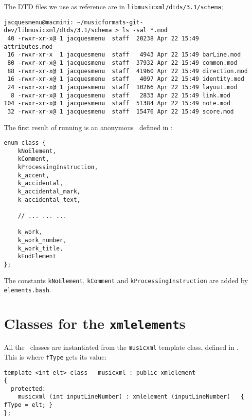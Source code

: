 The DTD files we use as reference are in {\tt libmusicxml/dtds/3.1/schema};
\begin{lstlisting}[language=Terminal]
jacquesmenu@macmini: ~/musicformats-git-dev/libmusicxml/dtds/3.1/schema > ls -sal *.mod
 40 -rwxr-xr-x@ 1 jacquesmenu  staff  20238 Apr 22 15:49 attributes.mod
 16 -rwxr-xr-x  1 jacquesmenu  staff   4943 Apr 22 15:49 barLine.mod
 80 -rwxr-xr-x@ 1 jacquesmenu  staff  37932 Apr 22 15:49 common.mod
 88 -rwxr-xr-x@ 1 jacquesmenu  staff  41960 Apr 22 15:49 direction.mod
 16 -rwxr-xr-x@ 1 jacquesmenu  staff   4097 Apr 22 15:49 identity.mod
 24 -rwxr-xr-x@ 1 jacquesmenu  staff  10266 Apr 22 15:49 layout.mod
  8 -rwxr-xr-x@ 1 jacquesmenu  staff   2833 Apr 22 15:49 link.mod
104 -rwxr-xr-x@ 1 jacquesmenu  staff  51384 Apr 22 15:49 note.mod
 32 -rwxr-xr-x@ 1 jacquesmenu  staff  15476 Apr 22 15:49 score.mod
\end{lstlisting}

The first result of running  is an anonymous \enumType\ defined in :
\begin{lstlisting}[language=CPlusPlus]
enum class {
	kNoElement,
	kComment,
	kProcessingInstruction,
	k_accent,
	k_accidental,
	k_accidental_mark,
	k_accidental_text,

	// ... ... ...

	k_work,
	k_work_number,
	k_work_title,
	kEndElement
};
\end{lstlisting}

The constants {\tt kNoElement}, {\tt kComment} and {\tt kProcessingInstruction} are added by {\tt elements.bash}.


\section{Classes for the {\tt xmlelement}s}

All the \mxml\ classes are instantiated from the {\tt musicxml} template class, defined in . This is where {\tt fType} gets its value:
\begin{lstlisting}[language=CPlusPlus]
template <int elt> class   musicxml : public xmlelement
{
  protected:
    musicxml (int inputLineNumber) : xmlelement (inputLineNumber)	{ fType = elt; }
};
\end{lstlisting}

